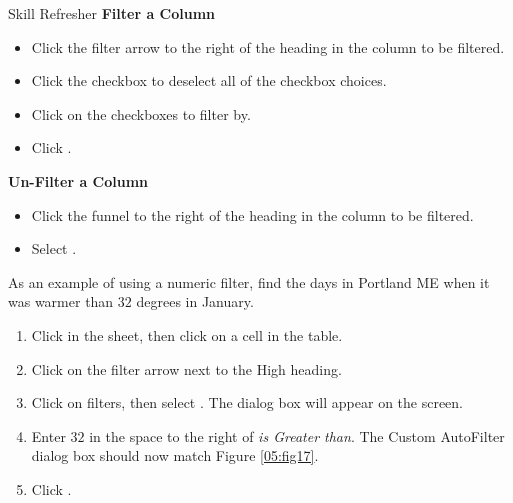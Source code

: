 \begin{center}
	\begin{sklbox}{Skill Refresher}
		\textbf{Filter a Column}
		\\
		\begin{itemize}
			\setlength{\itemsep}{0pt}
			\setlength{\parskip}{0pt}
			\setlength{\parsep}{0pt}

			\item Click the filter arrow to the right of the heading in the column to be filtered.
			\item Click the  checkbox to deselect all of the checkbox choices.
			\item Click on the checkboxes to filter by.
			\item Click .
			
		\end{itemize}
		
		\bigskip
		\textbf{Un-Filter a Column}
		
		\begin{itemize}
			\setlength{\itemsep}{0pt}
			\setlength{\parskip}{0pt}
			\setlength{\parsep}{0pt}
			
			\item Click the funnel to the right of the heading in the column to be filtered.
			\item Select .
			
		\end{itemize}
	\end{sklbox}
\end{center}

As an example of using a numeric filter, find the days in Portland ME when it was warmer than $ 32 $ degrees in January.

\begin{enumerate}
	\item Click in the  sheet, then click on a cell in the table.
	\item Click on the filter arrow next to the High heading.
	\item Click on  filters, then select . The  dialog box will appear on the screen.
	\item Enter $ 32 $ in the space to the right of \textit{is Greater than}. The Custom AutoFilter dialog box should now match Figure \ref{05:fig17}.
	\item Click .
\end{enumerate}

